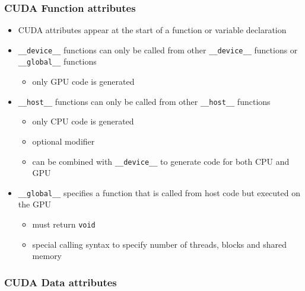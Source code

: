 \subsubsection{CUDA Function attributes}\label{cuda-function-attributes}

\begin{itemize}
\itemsep1pt\parskip0pt
\item
  CUDA attributes appear at the start of a function or variable
  declaration
\item
  \texttt{\_\_device\_\_} functions can only be called from other
  \texttt{\_\_device\_\_} functions or \texttt{\_\_global\_\_} functions

  \begin{itemize}
  \itemsep1pt\parskip0pt
  \item
    only GPU code is generated
  \end{itemize}
\item
  \texttt{\_\_host\_\_} functions can only be called from other
  \texttt{\_\_host\_\_} functions

  \begin{itemize}
  \itemsep1pt\parskip0pt
  \item
    only CPU code is generated
  \item
    optional modifier
  \item
    can be combined with \texttt{\_\_device\_\_} to generate code for
    both CPU and GPU
  \end{itemize}
\item
  \texttt{\_\_global\_\_} specifies a function that is called from host
  code but executed on the GPU

  \begin{itemize}
  \itemsep1pt\parskip0pt
  \item
    must return \texttt{void}
  \item
    special calling syntax to specify number of threads, blocks and
    shared memory
  \end{itemize}
\end{itemize}

\subsubsection{CUDA Data attributes}\label{cuda-data-attributes}

